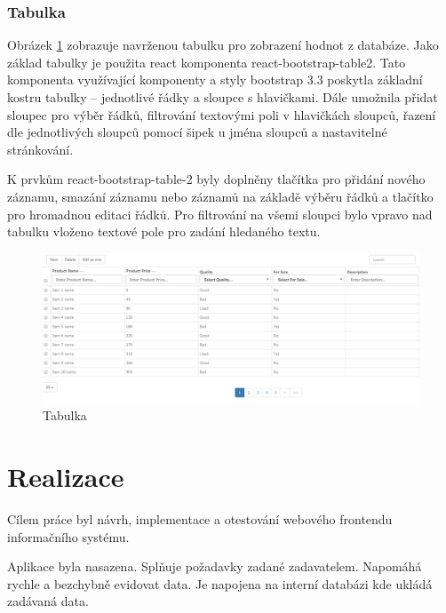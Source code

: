 \documentclass[thesis=B,czech]{FITthesis}[2012/06/26]
\begin{document}
\subsection{Tabulka}
	Obrázek \ref{tabulka} zobrazuje navrženou tabulku pro zobrazení hodnot z databáze. Jako základ tabulky je použita react komponenta react-bootstrap-table2. Tato komponenta využívající komponenty a styly bootstrap 3.3 poskytla základní kostru tabulky -- jednotlivé řádky a sloupce s hlavičkami. Dále umožnila přidat sloupec pro výběr řádků, filtrování textovými poli v hlavičkách sloupců, řazení dle jednotlivých sloupců pomocí šipek u jména sloupců a nastavitelné stránkování.
	
	K prvkům react-bootstrap-table-2 byly doplněny tlačítka pro přidání nového záznamu, smazání záznamu nebo záznamů na základě výběru řádků a tlačítko pro hromadnou editaci řádků. Pro filtrování na všemi sloupci bylo vpravo nad tabulku vloženo textové pole pro zadání hledaného textu.

\begin{figure}
	\includegraphics[width=\textwidth]{data_table.png}
	\caption{Tabulka}\label{tabulka}
\end{figure}
	

\chapter{Realizace}



\begin{conclusion}
	Cílem práce byl návrh, implementace a otestování webového frontendu informačního systému.
	
	Aplikace byla nasazena. Splňuje požadavky zadané zadavatelem. Napomáhá rychle a bezchybně evidovat data. Je napojena na interní databázi kde ukládá zadávaná data.
\end{conclusion}
\end{document}
